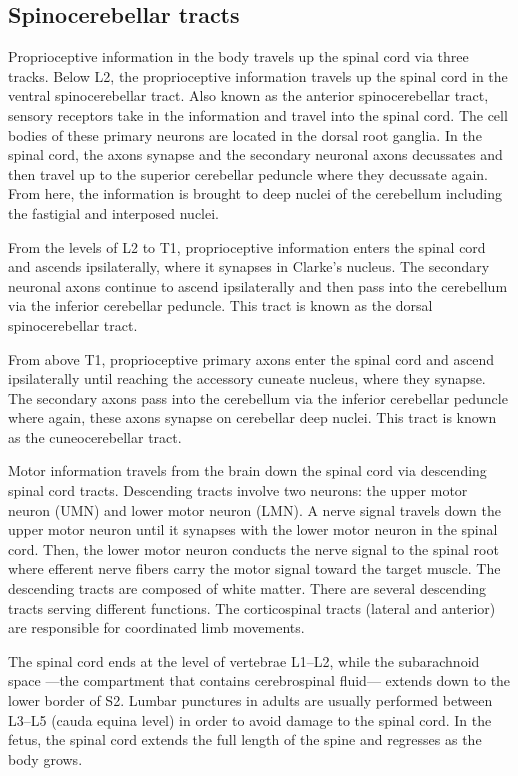 \documentclass[]{book}
\begin{document}
\hypertarget{spinocerebellar-tracts}{%
\subsection{Spinocerebellar tracts}\label{spinocerebellar-tracts}}

Proprioceptive information in the body travels up the spinal cord via three tracks. Below L2, the proprioceptive information travels up the spinal cord in the ventral spinocerebellar tract. Also known as the anterior spinocerebellar tract, sensory receptors take in the information and travel into the spinal cord. The cell bodies of these primary neurons are located in the dorsal root ganglia. In the spinal cord, the axons synapse and the secondary neuronal axons decussates and then travel up to the superior cerebellar peduncle where they decussate again. From here, the information is brought to deep nuclei of the cerebellum including the fastigial and interposed nuclei.

From the levels of L2 to T1, proprioceptive information enters the spinal cord and ascends ipsilaterally, where it synapses in Clarke's nucleus. The secondary neuronal axons continue to ascend ipsilaterally and then pass into the cerebellum via the inferior cerebellar peduncle. This tract is known as the dorsal spinocerebellar tract.

From above T1, proprioceptive primary axons enter the spinal cord and ascend ipsilaterally until reaching the accessory cuneate nucleus, where they synapse. The secondary axons pass into the cerebellum via the inferior cerebellar peduncle where again, these axons synapse on cerebellar deep nuclei. This tract is known as the cuneocerebellar tract.

Motor information travels from the brain down the spinal cord via descending spinal cord tracts. Descending tracts involve two neurons: the upper motor neuron (UMN) and lower motor neuron (LMN). A nerve signal travels down the upper motor neuron until it synapses with the lower motor neuron in the spinal cord. Then, the lower motor neuron conducts the nerve signal to the spinal root where efferent nerve fibers carry the motor signal toward the target muscle. The descending tracts are composed of white matter. There are several descending tracts serving different functions. The corticospinal tracts (lateral and anterior) are responsible for coordinated limb movements.

The spinal cord ends at the level of vertebrae L1--L2, while the subarachnoid space ---the compartment that contains cerebrospinal fluid--- extends down to the lower border of S2. Lumbar punctures in adults are usually performed between L3--L5 (cauda equina level) in order to avoid damage to the spinal cord. In the fetus, the spinal cord extends the full length of the spine and regresses as the body grows.
\end{document}
